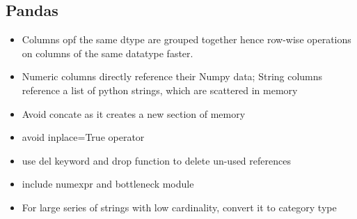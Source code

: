 \documentclass{article}
\begin{document}
	\subsection{Pandas}
		\begin{itemize}
			\item Columns opf the same dtype are grouped together hence row-wise operations on columns of the same datatype faster.
			\item Numeric columns directly reference their Numpy data; String columns reference a list of python strings, which are scattered in memory
			\item Avoid concate as it creates a new section of memory
			\item avoid inplace=True operator
			\item use del keyword and drop function to delete un-used references
			\item include numexpr and bottleneck module
			\item For large series of strings with low cardinality, convert it to category type
		\end{itemize}
\end{document}
